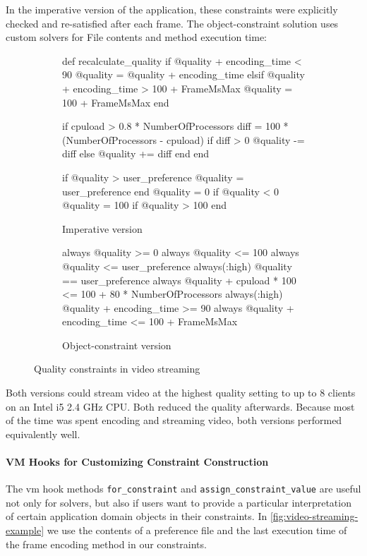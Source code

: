 In the imperative version of the application, these constraints were
explicitly checked and re-satisfied after each frame. The
object-constraint solution uses custom solvers for File contents and
method execution time:
\begin{figure}[h!]
  \begin{subfigure}[b]{0.48\textwidth}
    \begin{code}[basicstyle=\scriptsize,frame=none]
def recalculate_quality
  if @quality + encoding_time < 90
    @quality = @quality + encoding_time
  elsif @quality + encoding_time > 100 + FrameMsMax
    @quality = 100 + FrameMsMax
  end

  if cpuload > 0.8 * NumberOfProcessors
    diff = 100 * (NumberOfProcessors - cpuload)
    if diff > 0
      @quality -= diff
    else
      @quality += diff
    end
  end

  if @quality > user_preference
    @quality = user_preference
  end
  @quality = 0 if @quality < 0
  @quality = 100 if @quality > 100
end
    \end{code}
    \caption{Imperative version}
  \end{subfigure}
  \begin{subfigure}[b]{0.52\textwidth}
    \centering
    \begin{code}[basicstyle=\scriptsize,frame=none]
always { @quality >= 0 }
always { @quality <= 100 }
always { @quality <= user_preference }
always(:high) { @quality == user_preference }
always { @quality + cpuload * 100 <=
             100 + 80 * NumberOfProcessors }
always(:high) { @quality + encoding_time >= 90 }
always { @quality + encoding_time <=
             100 + FrameMsMax }
    \end{code}
    \caption{Object-constraint version}
  \end{subfigure}
  \caption{Quality constraints in video streaming}
  \label{fig:video-streaming-example}
\end{figure}

Both versions could stream video at the highest quality setting to up
to 8 clients on an Intel i5 2.4 GHz CPU. Both reduced the quality
afterwards. Because most of the time was spent encoding and streaming
video, both versions performed equivalently well.

\paragraph{VM Hooks for Customizing Constraint Construction}
The \ac{vm} hook methods \lstinline{for_constraint} and
\lstinline{assign_constraint_value} are useful not only for solvers,
but also if users want to provide a particular interpretation of
certain application domain objects in their constraints. In
\autoref{fig:video-streaming-example} we use the contents of a
preference file and the last execution time of the frame encoding
method in our constraints.

